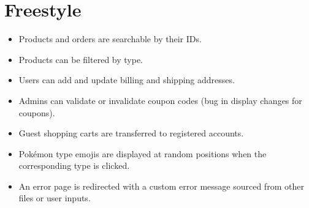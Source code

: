 \section{Freestyle}

\begin{itemize}
    \item Products and orders are searchable by their IDs.
    \item Products can be filtered by type.
    \item Users can add and update billing and shipping addresses.
    \item Admins can validate or invalidate coupon codes (bug in display changes for coupons).
    \item Guest shopping carts are transferred to registered accounts.
    \item Pokémon type emojis are displayed at random positions when the corresponding type is clicked.
    \item An error page is redirected with a custom error message sourced from other files or user inputs.
\end{itemize}
